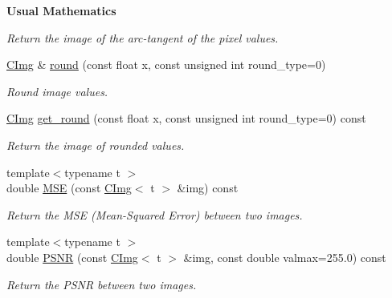 \begin{Indent}{\bf Usual Mathematics}
\begin{DoxyCompactItemize}
\begin{DoxyCompactList}\small\item\em Return the image of the arc-\/tangent of the pixel values. \item\end{DoxyCompactList}\item 
\hyperlink{structcimg__library_1_1_c_img}{CImg} \& \hyperlink{structcimg__library_1_1_c_img_afc1a4ffb591540103f80b06f6a4faf84}{round} (const float x, const unsigned int round\_\-type=0)
\begin{DoxyCompactList}\small\item\em Round image values. \item\end{DoxyCompactList}\item 
\hypertarget{structcimg__library_1_1_c_img_a13739baf4ed5d92e03463127a7e14768}{
\hyperlink{structcimg__library_1_1_c_img}{CImg} \hyperlink{structcimg__library_1_1_c_img_a13739baf4ed5d92e03463127a7e14768}{get\_\-round} (const float x, const unsigned int round\_\-type=0) const }
\label{structcimg__library_1_1_c_img_a13739baf4ed5d92e03463127a7e14768}

\begin{DoxyCompactList}\small\item\em Return the image of rounded values. \item\end{DoxyCompactList}\item 
\hypertarget{structcimg__library_1_1_c_img_ad13d39c9b399e5dc71435b50ed480402}{
{\footnotesize template$<$typename t $>$ }\\double \hyperlink{structcimg__library_1_1_c_img_ad13d39c9b399e5dc71435b50ed480402}{MSE} (const \hyperlink{structcimg__library_1_1_c_img}{CImg}$<$ t $>$ \&img) const }
\label{structcimg__library_1_1_c_img_ad13d39c9b399e5dc71435b50ed480402}

\begin{DoxyCompactList}\small\item\em Return the MSE (Mean-\/Squared Error) between two images. \item\end{DoxyCompactList}\item 
\hypertarget{structcimg__library_1_1_c_img_a086179764541ce3661720e22ddec26f6}{
{\footnotesize template$<$typename t $>$ }\\double \hyperlink{structcimg__library_1_1_c_img_a086179764541ce3661720e22ddec26f6}{PSNR} (const \hyperlink{structcimg__library_1_1_c_img}{CImg}$<$ t $>$ \&img, const double valmax=255.0) const }
\label{structcimg__library_1_1_c_img_a086179764541ce3661720e22ddec26f6}

\begin{DoxyCompactList}\small\item\em Return the PSNR between two images. \item\end{DoxyCompactList}\end{DoxyCompactItemize}
\end{Indent}
